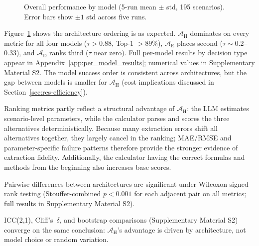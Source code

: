 \documentclass[a4paper,fleqn]{cas-dc}
\begin{document}
\begin{figure}[htbp]
\caption{Overall performance by model (5-run mean $\pm$ std, 195 scenarios). Error bars show $\pm 1$ std across five runs.}
\label{fig:grouped_bars}
\end{figure}
\FloatBarrier

Figure~\ref{fig:grouped_bars} shows the architecture ordering is as expected. $\mathcal{A}_{\text{H}}$ dominates on every metric for all four models ($\tau > 0.88$, Top-1 $> 89\%$), $\mathcal{A}_{\text{E}}$ places second ($\tau \sim 0.2$--0.33), and $\mathcal{A}_{\text{D}}$ ranks third ($\tau$ near zero). Full per-model results by decision type appear in Appendix~\ref{app:per_model_results}; numerical values in Supplementary Material S2. The model success order is consistent across architectures, but the gap between models is smaller for $\mathcal{A}_{\text{H}}$ (cost implications discussed in Section~\ref{sec:res-efficiency}).

Ranking metrics partly reflect a structural advantage of $\mathcal{A}_{\text{H}}$: the LLM estimates scenario-level parameters, while the calculator parses and scores the three alternatives deterministically. Because many extraction errors shift all alternatives together, they largely cancel in the ranking; MAE/RMSE and parameter-specific failure patterns therefore provide the stronger evidence of extraction fidelity. Additionally, the calculator having the correct formulas and methods from the beginning also increases base scores. 

Pairwise differences between architectures are significant under Wilcoxon signed-rank testing (Stouffer-combined $p < 0.001$ for each adjacent pair on all metrics; full results in Supplementary Material S2).

ICC(2,1), Cliff's~$\delta$, and bootstrap comparisons (Supplementary Material S2) converge on the same conclusion: $\mathcal{A}_{\text{H}}$'s advantage is driven by architecture, not model choice or random variation.
\end{document}
